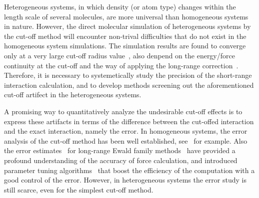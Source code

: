 \documentclass[aps,pre,preprint]{revtex4}
\begin{document}
Heterogeneous systems, in which density (or atom type) changes within
the length scale of several molecules, are more universal than
homogeneous systems in nature. However, the direct molecular
simulation of heterogeneous systems by the cut-off method will
encounter non-trival difficulties that do not exist in the homogeneous
system simulations.  The simulation results are found to converge only
at a very large cut-off radius value~\cite{duque2004some,
  ismail2007application}, also denpend on the energy/force continuity
at the cut-off and the way of applying the long-range
correction~\cite{trokhymchuk1999computer, shen2007comparative,
  guo1997long, mecke1997molecular, janecek2006long, goujon2004monte}.
Therefore, it is necessary to systemetically study the precision of
the short-range interaction calculation, and to develop methods
screening out the aforementioned cut-off artifect in the heterogeneous
systems.



A promising way to quantitatively analyze the undesirable cut-off
effects is to express these artifacts in terms of the difference
between the cut-offed interaction and the exact interaction, namely
the error. In homogeneous systems, the error analysis of the cut-off
method has been well established, see~\cite{kolafa1992cutoff} for
example. Also the error estimates~\cite{hummer1995numerical,
  kolafa1992cutoff, petersen1995accuracy, deserno1998mue2,
  wang2010optimizing} for long-range Ewald family
methods~\cite{ewald1921die, hockney1988computer, deserno1998mue1,
  darden1993pme, essmann1995spm} have provided a profound
understanding of the accuracy of force calculation, and introduced
parameter tuning algorithms~\cite{limbach06a, wang2010optimizing} that
boost the efficiency of the computation with a good control of the
error. However, in heterogeneous systems the error study is still
scarce, even for the simplest cut-off method.
\end{document}
